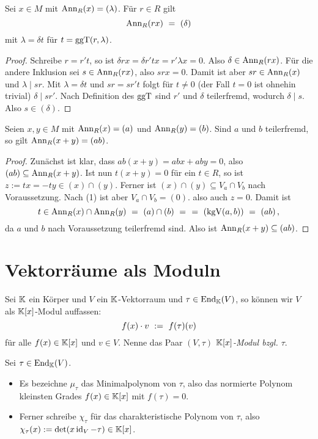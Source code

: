 \begin{lemma}
  \label{lemma:annihilator_ggt}
  Sei $x \in M$ mit $\operatorname{Ann}_R(x) = (\lambda)$. Für $r \in R$ gilt
  \[ \operatorname{Ann}_R(rx) \ =\  (\delta) \]
  mit $\lambda = \delta t$ für $t = \operatorname{ggT}(r,\lambda)$.
\end{lemma}
\begin{proof}
  Schreibe $r = r't$, so ist $\delta rx = \delta r'tx = r'\lambda x = 0$. Also
  $\delta \in \operatorname{Ann}_R(rx)$. Für die andere Inklusion sei $s \in \operatorname{Ann}_R(rx)$,
  also $srx = 0$. Damit ist aber $sr \in \operatorname{Ann}_R(x)$ und
  $\lambda \mid sr$. Mit $\lambda = \delta t$ und $sr = sr't$ folgt
  für $t\neq 0$ (der Fall $t=0$ ist ohnehin trivial) $\delta \mid sr'$.
  Nach Definition des $\operatorname{ggT}$ sind $r'$ und $\delta$ teilerfremd, wodurch
  $\delta \mid s$. Also $s \in (\delta)$.
\end{proof}


\begin{lemma}
  \label{lemma:annihilator_teilerfremd}
  Seien $x,y \in M$ mit $\operatorname{Ann}_R(x) = (a)$ und $\operatorname{Ann}_R(y) = (b)$. Sind 
  $a$ und $b$ teilerfremd, so gilt $\operatorname{Ann}_R(x+y) = (ab)$.
\end{lemma}
\begin{proof}
  Zunächst ist klar, dass $ab(x+y) = abx + aby = 0$, also 
  $(ab) \subseteq \operatorname{Ann}_R(x+y)$. Ist nun $t(x+y) = 0$ für ein $t \in R$, so
  ist $z:= tx = -ty \in (x)\cap(y)$. Ferner ist 
  $(x)\cap(y) \subseteq V_a \cap V_b$ nach Voraussetzung. 
  Nach  (1) ist aber $V_a \cap V_b = (0)$.
  also auch $z=0$. Damit ist 
  \[ t \in \operatorname{Ann}_R(x)\cap \operatorname{Ann}_R(y) \ =\  (a)\cap(b) \ =\  
    \ =\  (\operatorname{kgV}(a,b)) \ =\  (ab)\,,\]
  da $a$ und $b$ nach Voraussetzung teilerfremd sind.
  Also ist $\operatorname{Ann}_R(x+y) \subseteq (ab)$.
\end{proof}


\section{Vektorräume als Moduln}

\begin{definition}[$(V,\tau)$]
  \label{def:V_tau}
  Sei $\mathbb{K}$ ein Körper und $V$ ein $\mathbb{K}$-Vektorraum und 
  $\tau \in \operatorname{End}_\mathbb{K}(V)$, so können wir $V$ als $\mathbb{K}[x]$-Modul auffassen:
  \[ f(x) \cdot v \ :=\  f(\tau)(v)\]
  für alle $f(x) \in \mathbb{K}[x]$ und $v\in V$.
  Nenne das Paar $(V,\tau)$ \emph{$\mathbb{K}[x]$-Modul bzgl. $\tau$}.
\end{definition}

\begin{notation}
  Sei $\tau\in \operatorname{End}_\mathbb{K}(V)$.
  \begin{itemize}
  \item Es bezeichne $\mu_\tau$ das Minimalpolynom von 
    $\tau$, also das normierte Polynom kleinsten Grades $f(x)\in \mathbb{K}[x]$ mit 
    $f(\tau) = 0$.
  \item Ferner schreibe $\chi_\tau$ für das charakteristische Polynom von 
    $\tau$, also $\chi_\tau(x) := \det(x \operatorname{id}_V - \tau) \in \mathbb{K}[x]$.
  \end{itemize}
\end{notation}


